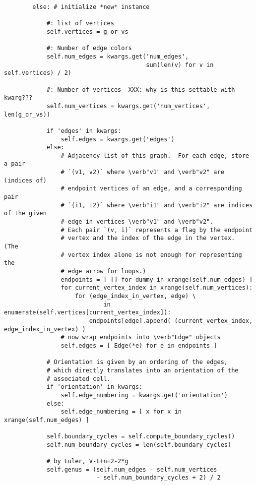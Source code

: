 \begin{lstlisting}
        else: # initialize *new* instance

            #: list of vertices
            self.vertices = g_or_vs

            #: Number of edge colors
            self.num_edges = kwargs.get('num_edges',
                                        sum(len(v) for v in self.vertices) / 2)

            #: Number of vertices  XXX: why is this settable with kwarg???
            self.num_vertices = kwargs.get('num_vertices', len(g_or_vs))

            if 'edges' in kwargs:
                self.edges = kwargs.get('edges')
            else:
                # Adjacency list of this graph.  For each edge, store a pair
                # `(v1, v2)` where \verb"v1" and \verb"v2" are (indices of)
                # endpoint vertices of an edge, and a corresponding pair
                # `(i1, i2)` where \verb"i1" and \verb"i2" are indices of the given
                # edge in vertices \verb"v1" and \verb"v2".
                # Each pair `(v, i)` represents a flag by the endpoint
                # vertex and the index of the edge in the vertex.  (The
                # vertex index alone is not enough for representing the
                # edge arrow for loops.)
                endpoints = [ [] for dummy in xrange(self.num_edges) ]
                for current_vertex_index in xrange(self.num_vertices):
                    for (edge_index_in_vertex, edge) \
                            in enumerate(self.vertices[current_vertex_index]):
                        endpoints[edge].append( (current_vertex_index, edge_index_in_vertex) )
                # now wrap endpoints into \verb"Edge" objects
                self.edges = [ Edge(*e) for e in endpoints ]

            # Orientation is given by an ordering of the edges,
            # which directly translates into an orientation of the
            # associated cell.  
            if 'orientation' in kwargs:
                self.edge_numbering = kwargs.get('orientation')
            else:
                self.edge_numbering = [ x for x in xrange(self.num_edges) ]

            self.boundary_cycles = self.compute_boundary_cycles()
            self.num_boundary_cycles = len(self.boundary_cycles)

            # by Euler, V-E+n=2-2*g
            self.genus = (self.num_edges - self.num_vertices
                          - self.num_boundary_cycles + 2) / 2


\end{lstlisting}
